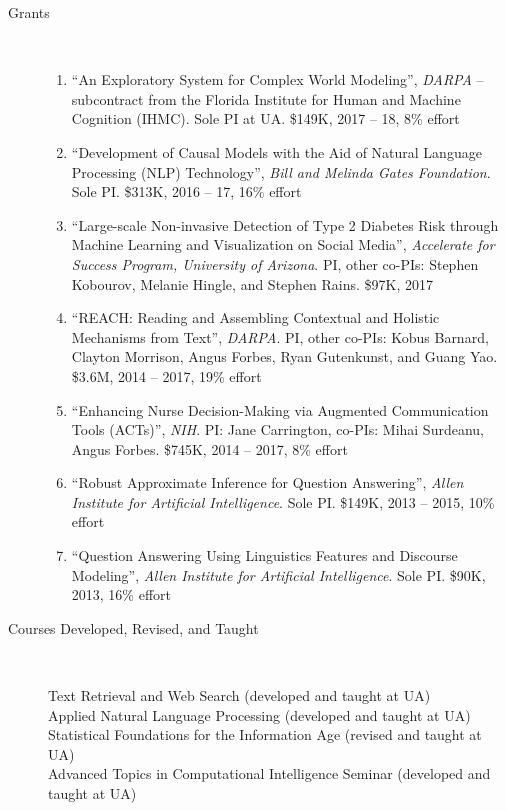 \documentclass[10pt]{article}
\newcommand{\ve}[1]{{\em #1}} %
\newcommand{\ti}[1]{``#1''} %
\begin{document}
\begin{description}
\begin{enumerate}
\end{enumerate}


\item [Grants]\
\begin{enumerate}

\item \ti{An Exploratory System for Complex World Modeling}, \ve{DARPA} -- subcontract from the Florida Institute for Human and Machine Cognition (IHMC). Sole PI at UA. \$149K, 2017 -- 18, 8\% effort

\item \ti{Development of Causal Models with the Aid of Natural Language Processing (NLP) Technology}, \ve{Bill and Melinda Gates Foundation}. Sole PI. \$313K, 2016 -- 17, 16\% effort

\item \ti{Large-scale Non-invasive Detection of Type 2 Diabetes Risk through Machine Learning and Visualization on Social Media}, \ve{Accelerate for Success Program, University of Arizona}. PI, other co-PIs: Stephen Kobourov, Melanie Hingle, and Stephen Rains. \$97K, 2017

\item \ti{REACH: Reading and Assembling Contextual and Holistic Mechanisms from Text}, \ve{DARPA}. PI, other co-PIs: Kobus Barnard, Clayton Morrison, Angus Forbes, Ryan Gutenkunst, and Guang Yao. \$3.6M, 2014 -- 2017, 19\% effort

\item \ti{Enhancing Nurse Decision-Making via Augmented Communication Tools (ACTs)}, \ve{NIH}. PI: Jane Carrington, co-PIs: Mihai Surdeanu, Angus Forbes. \$745K, 2014 -- 2017, 8\% effort

\item \ti{Robust Approximate Inference for Question Answering}, \ve{Allen Institute for Artificial Intelligence}. Sole PI. \$149K, 2013 -- 2015, 10\% effort

\item \ti{Question Answering Using Linguistics Features and Discourse Modeling}, \ve{Allen Institute for Artificial Intelligence}. Sole PI. \$90K, 2013, 16\% effort

\end{enumerate}

\vspace{-.1cm}\item [Courses Developed, Revised, and Taught]\
	
Text Retrieval and Web Search (developed and taught at UA)\\
Applied Natural Language Processing  (developed and taught at UA)\\
Statistical Foundations for the Information Age (revised and taught at UA)\\
Advanced Topics in Computational Intelligence Seminar (developed and taught at UA)


\end{description}
\end{document}
